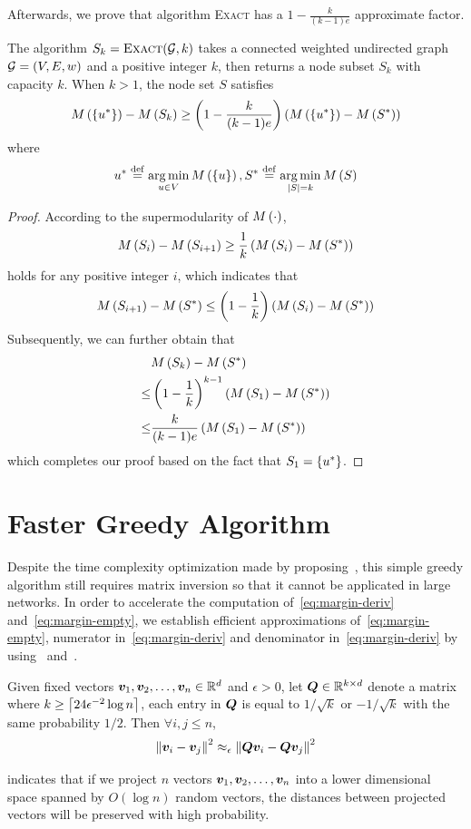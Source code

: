 \documentclass[sigconf]{acmart}
\begin{document}
Afterwards, we prove that algorithm \textsc{Exact} has a \(1-\frac{k}{(k-1)e}\) approximate factor.
\begin{theorem}
    The algorithm \(S_k=\textsc{Exact}(\mathcal{G},k)\) takes a connected weighted undirected graph \(\mathcal{G}=(V,E,w)\) and a positive integer \(k\), then returns a node subset \(S_k\) with capacity \(k\).
    When \(k>1\), the node set \(S\) satisfies
    \[M\left(\left\{u^* \right\}\right)-M\left(S_k\right)\ge\left( 1-\frac{k}{(k-1)e} \right)\left( M\left(\left\{u^* \right\}\right)-M\left(S^*\right) \right)\]
    where
    \[u^*\stackrel{\mathrm{def}}{=}\operatorname*{arg\,min}_{u\in V}M\left(\left\{u \right\}\right),S^*\stackrel{\mathrm{def}}{=}\operatorname*{arg\,min}_{\left|S \right|=k}M\left(S\right)\]
\end{theorem}
\begin{proof}
    According to the supermodularity of \(M\left(\cdot\right)\),
    \[M\left(S_i\right)-M\left(S_{i+1}\right)\ge\frac{1}{k}\left( M\left(S_i\right)-M\left(S^*\right) \right)\]
    holds for any positive integer \(i\), which indicates that
    \[M\left(S_{i+1}\right)-M\left(S^*\right)\le\left( 1-\frac{1}{k} \right)\left( M\left(S_i\right)-M\left(S^*\right) \right)\]
    Subsequently, we can further obtain that
    \begin{align*}
            & M\left(S_k\right)-M\left(S^*\right)                                    \\
        \le & \left( 1-\frac{1}{k} \right)^{k-1}\left( M\left(S_1\right)-M\left(S^*\right) \right) \\
        \le & \frac{k}{(k-1)e}\left( M\left(S_1\right)-M\left(S^*\right) \right)
    \end{align*}
    which completes our proof based on the fact that \(S_1=\left\{u^* \right\}\).
\end{proof}

\section{Faster Greedy Algorithm}\label{sec:faster-greedy}

Despite the time complexity optimization made by proposing~, this simple greedy algorithm still requires matrix inversion so that it cannot be applicated in large networks. In order to accelerate the computation of~\eqref{eq:margin-deriv} and~\eqref{eq:margin-empty}, we establish efficient approximations of~\eqref{eq:margin-empty}, numerator in~\eqref{eq:margin-deriv} and denominator in~\eqref{eq:margin-deriv} by using~ and~.

\begin{lemma}\label{lem:JL}
    Given fixed vectors \(\boldsymbol{v}_1,\boldsymbol{v}_2,\dots,\boldsymbol{v}_n\in\mathbb{R}^d\) and \(\epsilon>0\), let \(\boldsymbol{Q}\in\mathbb{R}^{k\times d}\) denote a matrix where \(k\ge\left\lceil24\epsilon^{-2}\log n\right\rceil\), each entry in \(\boldsymbol{Q}\) is equal to \(1/\sqrt k\) or \(-1/\sqrt k\) with the same probability \(1/2\). Then \(\forall i,j\le n\),
    \begin{equation}\label{eq:JL}
        \left\Vert\boldsymbol{v}_i-\boldsymbol{v}_j\right\Vert^2\approx_\epsilon\left\Vert\boldsymbol{Q}\boldsymbol{v}_i-\boldsymbol{Q}\boldsymbol{v}_j\right\Vert^2
    \end{equation}
\end{lemma}
 indicates that if we project \(n\) vectors \(\boldsymbol{v}_1,\boldsymbol{v}_2,\dots,\boldsymbol{v}_n\) into a lower dimensional space spanned by \(O(\log n)\) random vectors, the distances between projected vectors will be preserved with high probability.
\end{document}
